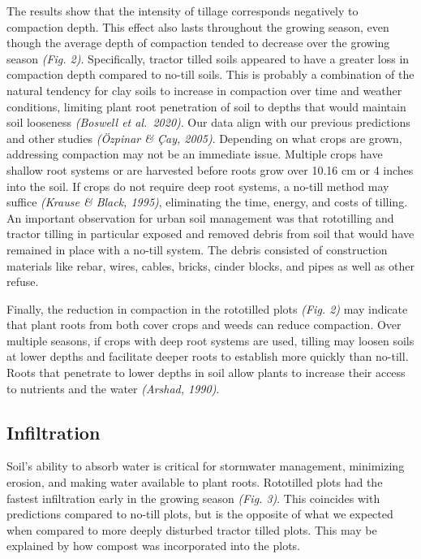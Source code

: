 \documentclass[
]{article}
\begin{document}
The results show that the intensity of tillage corresponds negatively to compaction depth.
This effect also lasts throughout the growing season, even though the average depth of compaction tended to decrease over the growing season \emph{(Fig. 2)}.
Specifically, tractor tilled soils appeared to have a greater loss in compaction depth compared to no-till soils.
This is probably a combination of the natural tendency for clay soils to increase in compaction over time and weather conditions, limiting plant root penetration of soil to depths that would maintain soil looseness \emph{(Boswell et al.~2020)}.
Our data align with our previous predictions and other studies \emph{(Özpinar \& Çay, 2005)}.
Depending on what crops are grown, addressing compaction may not be an immediate issue.
Multiple crops have shallow root systems or are harvested before roots grow over 10.16 cm or 4 inches into the soil.
If crops do not require deep root systems, a no-till method may suffice \emph{(Krause \& Black, 1995)}, eliminating the time, energy, and costs of tilling.
An important observation for urban soil management was that rototilling and tractor tilling in particular exposed and removed debris from soil that would have remained in place with a no-till system.
The debris consisted of construction materials like rebar, wires, cables, bricks, cinder blocks, and pipes as well as other refuse.

\hfill\break

Finally, the reduction in compaction in the rototilled plots \emph{(Fig. 2)} may indicate that plant roots from both cover crops and weeds can reduce compaction.
Over multiple seasons, if crops with deep root systems are used, tilling may loosen soils at lower depths and facilitate deeper roots to establish more quickly than no-till.
Roots that penetrate to lower depths in soil allow plants to increase their access to nutrients and the water \emph{(Arshad, 1990)}.

\hypertarget{infiltration-2}{%
\subsection{Infiltration}\label{infiltration-2}}

Soil's ability to absorb water is critical for stormwater management, minimizing erosion, and making water available to plant roots.
Rototilled plots had the fastest infiltration early in the growing season \emph{(Fig. 3)}.
This coincides with predictions compared to no-till plots, but is the opposite of what we expected when compared to more deeply disturbed tractor tilled plots.
This may be explained by how compost was incorporated into the plots.
\end{document}
